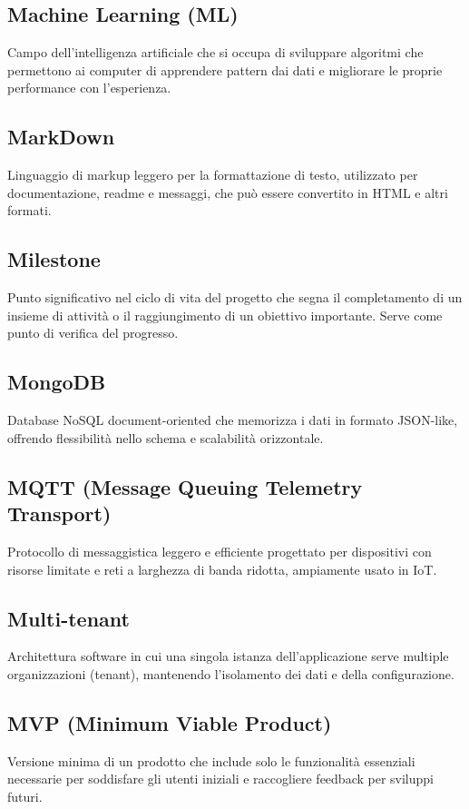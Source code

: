 \documentclass[a4paper,11pt]{article}
\begin{document}
\subsection{Machine Learning (ML)}
Campo dell'intelligenza artificiale che si occupa di sviluppare algoritmi che permettono ai computer di apprendere pattern dai dati e migliorare le proprie performance con l'esperienza.

\subsection{MarkDown}
Linguaggio di markup leggero per la formattazione di testo, utilizzato per documentazione, readme e messaggi, che può essere convertito in HTML e altri formati.

\subsection{Milestone}
Punto significativo nel ciclo di vita del progetto che segna il completamento di un insieme di attività o il raggiungimento di un obiettivo importante. Serve come punto di verifica del progresso.

\subsection{MongoDB}
Database NoSQL document-oriented che memorizza i dati in formato JSON-like, offrendo flessibilità nello schema e scalabilità orizzontale.

\subsection{MQTT (Message Queuing Telemetry Transport)}
Protocollo di messaggistica leggero e efficiente progettato per dispositivi con risorse limitate e reti a larghezza di banda ridotta, ampiamente usato in IoT.

\subsection{Multi-tenant}
Architettura software in cui una singola istanza dell'applicazione serve multiple organizzazioni (tenant), mantenendo l'isolamento dei dati e della configurazione.

\subsection{MVP (Minimum Viable Product)}
Versione minima di un prodotto che include solo le funzionalità essenziali necessarie per soddisfare gli utenti iniziali e raccogliere feedback per sviluppi futuri.
\end{document}
